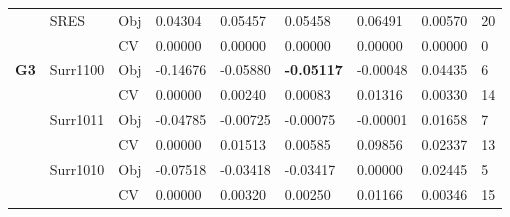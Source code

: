 \begin{table*}[!htb]
\begin{tabular}{lllllllll}
		& SRES                               & Obj                                & 0.04304                            & 0.05457                            & 0.05458                              & 0.06491                             & 0.00570                           & 20               \\
		&                                    & CV                                 & 0.00000                            & 0.00000                            & 0.00000                              & 0.00000                             & 0.00000                           & 0                \\ \hline
		\multirow{16}{*}{\textbf{G3}}           & Surr1100                           & Obj                                & -0.14676                           & -0.05880                           & \textbf{-0.05117}                             & -0.00048                            & 0.04435                           & 6                \\
		&                                    & CV                                 & 0.00000                            & 0.00240                            & 0.00083                              & 0.01316                             & 0.00330                           & 14               \\
		& Surr1011                           & Obj                                & -0.04785                           & -0.00725                           & -0.00075                             & -0.00001                            & 0.01658                           & 7                \\
		&                                    & CV                                 & 0.00000                            & 0.01513                            & 0.00585                              & 0.09856                             & 0.02337                           & 13               \\
		& Surr1010                           & Obj                                & -0.07518                           & -0.03418                           & -0.03417                             & 0.00000                             & 0.02445                           & 5                \\
		&                                    & CV                                 & 0.00000                            & 0.00320                            & 0.00250                              & 0.01166                             & 0.00346                           & 15               \\

\end{tabular}
\end{table*}
